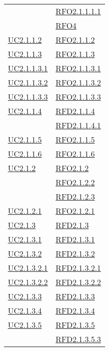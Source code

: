 \begin{longtable}{|>{\centering}m{5cm}|m{5cm}<{\centering}|}
& \hyperlink{RFO2.1.1.1.1}{RFO2.1.1.1.1}\\
& \hyperlink{RFO4}{RFO4}\\ \hline
\hyperref[UC2.1.1.2]{UC2.1.1.2} & \hyperlink{RFO2.1.1.2}{RFO2.1.1.2}\\ \hline
\hyperref[UC2.1.1.3]{UC2.1.1.3} & \hyperlink{RFO2.1.1.3}{RFO2.1.1.3}\\ \hline
\hyperref[UC2.1.1.3.1]{UC2.1.1.3.1} & \hyperlink{RFO2.1.1.3.1}{RFO2.1.1.3.1}\\ \hline
\hyperref[UC2.1.1.3.2]{UC2.1.1.3.2} & \hyperlink{RFO2.1.1.3.2}{RFO2.1.1.3.2}\\ \hline
\hyperref[UC2.1.1.3.3]{UC2.1.1.3.3} & \hyperlink{RFO2.1.1.3.3}{RFO2.1.1.3.3}\\ \hline
\hyperref[UC2.1.1.4]{UC2.1.1.4} & \hyperlink{RFD2.1.1.4}{RFD2.1.1.4}\\
& \hyperlink{RFD2.1.1.4.1}{RFD2.1.1.4.1}\\ \hline
\hyperref[UC2.1.1.5]{UC2.1.1.5} & \hyperlink{RFO2.1.1.5}{RFO2.1.1.5}\\ \hline
\hyperref[UC2.1.1.6]{UC2.1.1.6} & \hyperlink{RFO2.1.1.6}{RFO2.1.1.6}\\ \hline
\hyperref[UC2.1.2]{UC2.1.2} & \hyperlink{RFO2.1.2}{RFO2.1.2}\\
& \hyperlink{RFO2.1.2.2}{RFO2.1.2.2}\\
& \hyperlink{RFD2.1.2.3}{RFD2.1.2.3}\\ \hline
\hyperref[UC2.1.2.1]{UC2.1.2.1} & \hyperlink{RFO2.1.2.1}{RFO2.1.2.1}\\ \hline
\hyperref[UC2.1.3]{UC2.1.3} & \hyperlink{RFD2.1.3}{RFD2.1.3}\\ \hline
\hyperref[UC2.1.3.1]{UC2.1.3.1} & \hyperlink{RFD2.1.3.1}{RFD2.1.3.1}\\ \hline
\hyperref[UC2.1.3.2]{UC2.1.3.2} & \hyperlink{RFD2.1.3.2}{RFD2.1.3.2}\\ \hline
\hyperref[UC2.1.3.2.1]{UC2.1.3.2.1} & \hyperlink{RFD2.1.3.2.1}{RFD2.1.3.2.1}\\ \hline
\hyperref[UC2.1.3.2.2]{UC2.1.3.2.2} & \hyperlink{RFD2.1.3.2.2}{RFD2.1.3.2.2}\\ \hline
\hyperref[UC2.1.3.3]{UC2.1.3.3} & \hyperlink{RFD2.1.3.3}{RFD2.1.3.3}\\ \hline
\hyperref[UC2.1.3.4]{UC2.1.3.4} & \hyperlink{RFD2.1.3.4}{RFD2.1.3.4}\\ \hline
\hyperref[UC2.1.3.5]{UC2.1.3.5} & \hyperlink{RFD2.1.3.5}{RFD2.1.3.5}\\
& \hyperlink{RFD2.1.3.5.3}{RFD2.1.3.5.3}\\

\end{longtable}
